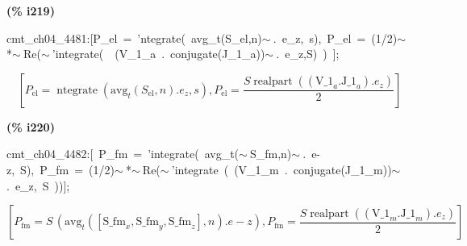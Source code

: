 \documentclass[fleqn]{article}
\begin{document}
\noindent
\begin{minipage}[t]{4.000000em}\color{red}\bfseries
(\% i219)	
\end{minipage}
\begin{minipage}[t]{\textwidth}\color{blue}
cmt\_ch04\_4481:[P\_el\ =\ 'ntegrate(\ avg\_t(S\_el,n)\ensuremath{\sim\ }.\ e\_z,\ s),\ P\_el\ =\ (1/2)\ensuremath{\sim\ }*\ensuremath{\sim\ }Re(\ensuremath{\sim\ }'integrate(\ \ (V\_1\_a\ .\ conjugate(J\_1\_a))\ensuremath{\sim\ }.\ e\_z,S)\ )\ ];
\end{minipage}
\[\displaystyle \tag{\% o219} 
\left[ {P_{\ensuremath{\mathrm{el}}}}=\operatorname{ntegrate}\left( {{\ensuremath{\mathrm{avg}}}_t}\left( {S_{\ensuremath{\mathrm{el}}}}\operatorname{,}n\right) \ensuremath{\mathrm{ . }}{e_z}\operatorname{,}s\right) \operatorname{,}{P_{\ensuremath{\mathrm{el}}}}=\frac{S \operatorname{realpart}\left( \left( {{\ensuremath{\mathrm{V\_ 1}}}_a}\ensuremath{\mathrm{ . }}{{\ensuremath{\mathrm{J\_ 1}}}_a}\right) \ensuremath{\mathrm{ . }}{e_z}\right) }{2}\right] \mbox{}
\]


\noindent
\begin{minipage}[t]{4.000000em}\color{red}\bfseries
(\% i220)	
\end{minipage}
\begin{minipage}[t]{\textwidth}\color{blue}
cmt\_ch04\_4482:[\ P\_fm\ =\ 'integrate(\ avg\_t(\ensuremath{\sim\ }S\_fm,n)\ensuremath{\sim\ }.\ e-z,\ S),\ P\_fm\ =\ (1/2)\ensuremath{\sim\ }*\ensuremath{\sim\ }Re(\ensuremath{\sim\ }'integrate\ (\ (V\_1\_m\ .\ conjugate(J\_1\_m))\ensuremath{\sim\ }.\ e\_z,\ S\ ))];
\end{minipage}
\[\displaystyle \tag{\% o220} 
\left[ {P_{\ensuremath{\mathrm{fm}}}}=S\, \left( {{\ensuremath{\mathrm{avg}}}_t}\left( \left[ {{\ensuremath{\mathrm{S\_ fm}}}_x}\operatorname{,}{{\ensuremath{\mathrm{S\_ fm}}}_y}\operatorname{,}{{\ensuremath{\mathrm{S\_ fm}}}_z}\right] \operatorname{,}n\right) \ensuremath{\mathrm{ . }}e-z\right) \operatorname{,}{P_{\ensuremath{\mathrm{fm}}}}=\frac{S \operatorname{realpart}\left( \left( {{\ensuremath{\mathrm{V\_ 1}}}_m}\ensuremath{\mathrm{ . }}{{\ensuremath{\mathrm{J\_ 1}}}_m}\right) \ensuremath{\mathrm{ . }}{e_z}\right) }{2}\right] \mbox{}
\]
\end{document}
